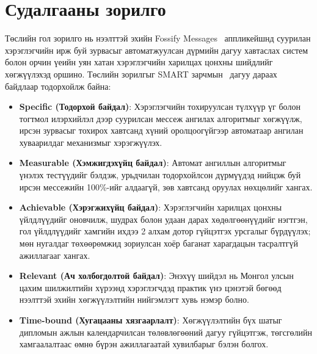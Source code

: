 \section{Судалгааны зорилго}
Төслийн гол зорилго нь нээлттэй эхийн Fossify Messages~\cite{fossify_messages} аппликейшнд суурилан хэрэглэгчийн ирж буй зурвасыг автоматжуулсан дүрмийн дагуу хавтаслах систем болон орчин үеийн уян хатан хэрэглэгчийн харилцах цонхны шийдлийг хөгжүүлэхэд оршино. Төслийн зорилгыг SMART зарчмын~\cite{doran_smart} дагуу дараах байдлаар тодорхойлж байна:

\begin{itemize}
    \item \textbf{Specific (Тодорхой байдал)}: Хэрэглэгчийн тохируулсан түлхүүр үг болон тогтмол илэрхийлэл дээр суурилсан мессеж ангилах алгоритмыг хөгжүүлж, ирсэн зурвасыг тохирох хавтсанд хүний оролцоогүйгээр автоматаар ангилан хуваарилдаг механизмыг хэрэгжүүлэх.
    \item \textbf{Measurable (Хэмжигдэхүйц байдал)}: Автомат ангиллын алгоритмыг үнэлэх тестүүдийг бэлдэж, урьдчилан тодорхойлсон дүрмүүдэд нийцэж буй ирсэн мессежийн 100\%-ийг алдаагүй, зөв хавтсанд оруулах нөхцөлийг хангах.
    \item \textbf{Achievable (Хэрэгжихүйц байдал)}: Хэрэглэгчийн харилцах цонхны үйлдлүүдийг оновчилж, шудрах болон удаан дарах хөдөлгөөнүүдийг нэгтгэн, гол үйлдлүүдийг хамгийн ихдээ 2 алхам дотор гүйцэтгэх урсгалыг бүрдүүлэх; мөн нугалдаг төхөөрөмжид зориулсан хоёр баганат харагдацын тасралтгүй ажиллагааг хангах.
    \item \textbf{Relevant (Ач холбогдолтой байдал)}: Энэхүү шийдэл нь Монгол улсын цахим шилжилтийн хүрээнд хэрэглэгчдэд практик үнэ цэнэтэй бөгөөд нээлттэй эхийн хөгжүүлэлтийн нийгэмлэгт хувь нэмэр болно.
    \item \textbf{Time-bound (Хугацааны хязгаарлалт)}: Хөгжүүлэлтийн бүх шатыг дипломын ажлын календарчилсан төлөвлөгөөний дагуу гүйцэтгэж, төгсгөлийн хамгаалалтаас өмнө бүрэн ажиллагаатай хувилбарыг бэлэн болгох.
\end{itemize}

